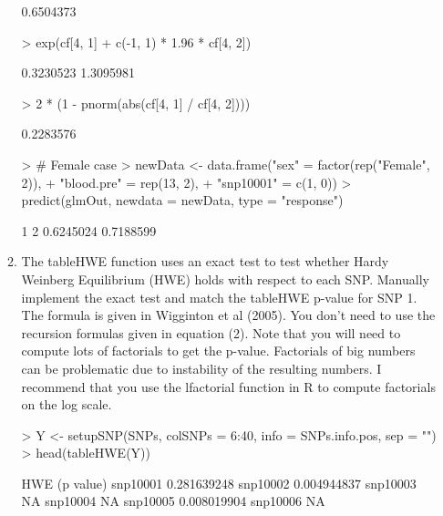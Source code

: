 \documentclass[12pt,a4paper]{paper}
\begin{document}
\begin{enumerate}
\begin{enumerate}
\begin{Schunk}
\begin{Soutput}
[1] 0.6504373
\end{Soutput}
\begin{Sinput}
> exp(cf[4, 1] + c(-1, 1) * 1.96 * cf[4, 2])
\end{Sinput}
\begin{Soutput}
[1] 0.3230523 1.3095981
\end{Soutput}
\begin{Sinput}
> 2 * (1 - pnorm(abs(cf[4, 1] / cf[4, 2])))
\end{Sinput}
\begin{Soutput}
[1] 0.2283576
\end{Soutput}
\begin{Sinput}
> # Female case
> newData <- data.frame("sex" = factor(rep("Female", 2)), 
+                       "blood.pre" = rep(13, 2), 
+                       "snp10001" = c(1, 0))
> predict(glmOut, newdata = newData, type = "response")
\end{Sinput}
\begin{Soutput}
        1         2 
0.6245024 0.7188599 
\end{Soutput}
\end{Schunk}
\item The tableHWE function uses an exact test to test whether Hardy Weinberg Equilibrium (HWE) holds with respect to each SNP. Manually implement the exact test and match the tableHWE p-value for SNP 1. The formula is given in Wigginton et al (2005). You don’t need to use the recursion formulas given in equation (2). Note that you will need to compute lots of factorials to get the p-value. Factorials of big numbers can be problematic due to instability of the resulting numbers. I recommend that you use the lfactorial function in R to compute factorials on the log scale.
\begin{Schunk}
\begin{Sinput}
> Y <- setupSNP(SNPs, colSNPs = 6:40, info = SNPs.info.pos, sep = "")
> head(tableHWE(Y))
\end{Sinput}
\begin{Soutput}
         HWE (p value)
snp10001   0.281639248
snp10002   0.004944837
snp10003            NA
snp10004            NA
snp10005   0.008019904
snp10006            NA
\end{Soutput}
\begin{Sinput}

\end{Sinput}
\end{Schunk}
\end{enumerate}
\end{enumerate}
\end{document}
